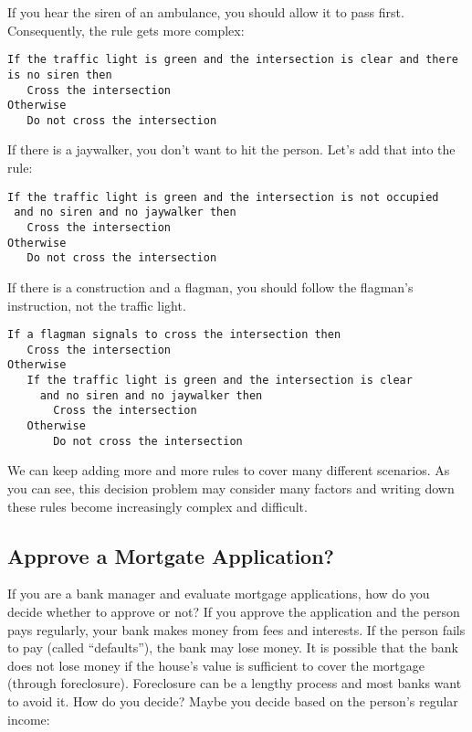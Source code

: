 If you hear the siren of an ambulance, you should allow it to pass first.
Consequently, the rule gets more complex:

\begin{verbatim}
If the traffic light is green and the intersection is clear and there is no siren then
   Cross the intersection
Otherwise
   Do not cross the intersection
\end{verbatim}

If there is a jaywalker, you don't want to hit the person. Let's add that into the rule:

\begin{verbatim}
If the traffic light is green and the intersection is not occupied 
 and no siren and no jaywalker then
   Cross the intersection
Otherwise
   Do not cross the intersection
\end{verbatim}

If there is a construction and a flagman, you should follow the
flagman's instruction, not the traffic light.  

\begin{verbatim}
If a flagman signals to cross the intersection then
   Cross the intersection
Otherwise
   If the traffic light is green and the intersection is clear 
     and no siren and no jaywalker then
       Cross the intersection
   Otherwise
       Do not cross the intersection
\end{verbatim}

We can keep adding more and more rules to cover many different
scenarios.  As you can see, this decision problem may consider many
factors and writing down these rules become increasingly complex and
difficult.

\subsection{Approve a Mortgate Application?}

If you are a bank manager and evaluate mortgage applications, how do
you decide whether to approve or not?  If you approve the application
and the person pays regularly, your bank makes money from fees and
interests.  If the person fails to pay (called ``defaults''), the bank
may lose money. It is possible that the bank does not lose money
if the house's value is sufficient to cover the mortgage (through
foreclosure). Foreclosure can be a lengthy process and most banks want
to avoid it.  How do you decide? Maybe you decide based on the
person's regular income:  


